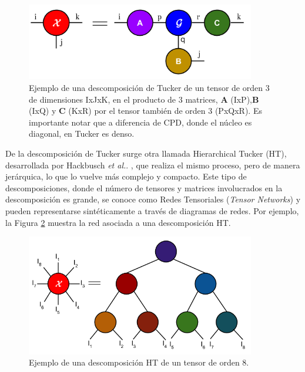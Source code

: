 \documentclass[spanish]{article}
\theoremstyle{definition}
\theoremstyle{remark}
\numberwithin{equation}{section}
\numberwithin{equation}{section} %
\begin{document}
 \begin{figure}[H]
 \centering
 \includegraphics[width=10cm]{img/descomposicion_tucker.png}
\caption[Ejemplo descomposición de Tucker]{\footnotesize{Ejemplo de una descomposición de Tucker de un tensor   de orden 3 de dimensiones IxJxK, en el producto de 3 matrices, \textbf{A} (IxP),\textbf{B} (IxQ) y \textbf{C} (KxR) por el tensor  también de orden 3 (PxQxR). Es importante notar que a diferencia de CPD, donde el núcleo es diagonal, en Tucker es denso.
}} 
\label{fig:descomposicion_tucker}
\end{figure}
De la descomposición de Tucker surge otra llamada Hierarchical Tucker (HT), desarrollada por Hackbusch \textit{et al.}. \cite{hackbusch2009new}, que realiza el mismo proceso, pero de manera jerárquica, lo que lo vuelve más complejo y compacto. Este tipo de descomposiciones, donde el número de tensores y matrices involucrados en la descomposición es grande, se conoce como Redes Tensoriales ({\it Tensor Networks}) y pueden representarse sintéticamente a través de diagramas de redes. Por ejemplo, la Figura \ref{fig:descomposicion_ht} muestra la red asociada a una descomposición HT.\par

\begin{figure}[H]
 \centering
 \includegraphics[width=10cm]{img/descomposicion_hierarchical_tucker.png}
\caption[Ejemplo descomposición Jerárquica de Tucker]{\footnotesize{Ejemplo de una descomposición HT de un tensor   de orden 8.
}} 
\label{fig:descomposicion_ht}
\end{figure}
\end{document}
